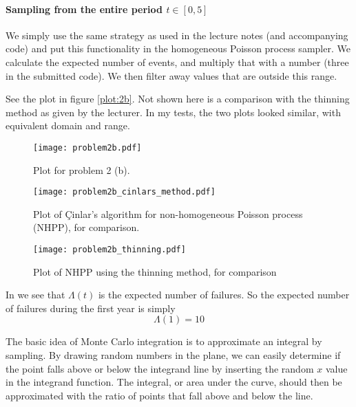 \documentclass[a4paper,english,12pt]{article}
\begin{document}
\paragraph{Sampling from the entire period $t \in [0,5]$}
We simply use the same strategy as used in the lecture notes (and accompanying
code) and put this functionality in the homogeneous Poisson process sampler.
We calculate the expected number of events, and multiply that with a number
(three in the submitted code). We then filter away values that are outside this
range.

See the plot in figure \vref{plot:2b}. Not shown here is a comparison with the
thinning method as given by the lecturer. In my tests, the two plots looked
similar, with equivalent domain and range.

\begin{figure}
  \centering
  \texttt{[image: problem2b.pdf]}
  \caption{Plot for problem 2 (b).}
  \label{plot:2b}
\end{figure}

\begin{figure}
  \centering
  \texttt{[image: problem2b\_cinlars\_method.pdf]}
  \caption{Plot of Çinlar's algorithm for non-homogeneous Poisson process
  (NHPP), for comparison.}
  \label{plot:cinlar}
\end{figure}

\begin{figure}
  \centering
  \texttt{[image: problem2b\_thinning.pdf]}
  \caption{Plot of NHPP using the thinning method, for comparison}
  \label{plot:thinning}
\end{figure}

In \cite{generating} we see that $\Lambda(t)$ is the expected number of
failures. So the expected number of failures during the first year is simply
\[
  \Lambda(1) = 10
\]


\clearpage
{}
The basic idea of Monte Carlo integration is to approximate an integral by
sampling. By drawing random numbers in the plane, we can easily determine if
the point falls above or below the integrand line by inserting the random $x$
value in the integrand function. The integral, or area under the curve, should
then be approximated with the ratio of points that fall above and below the
line.
\end{document}
